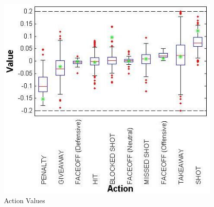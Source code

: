 \documentclass[]{article}
\begin{document}
%
\begin{figure}[ht]
\includegraphics[width = 1.0\columnwidth]{boxplot_actionvalues4}
\caption{Action Values}
\label{fig:boxplot-action-values}
\end{figure}
\end{document}
